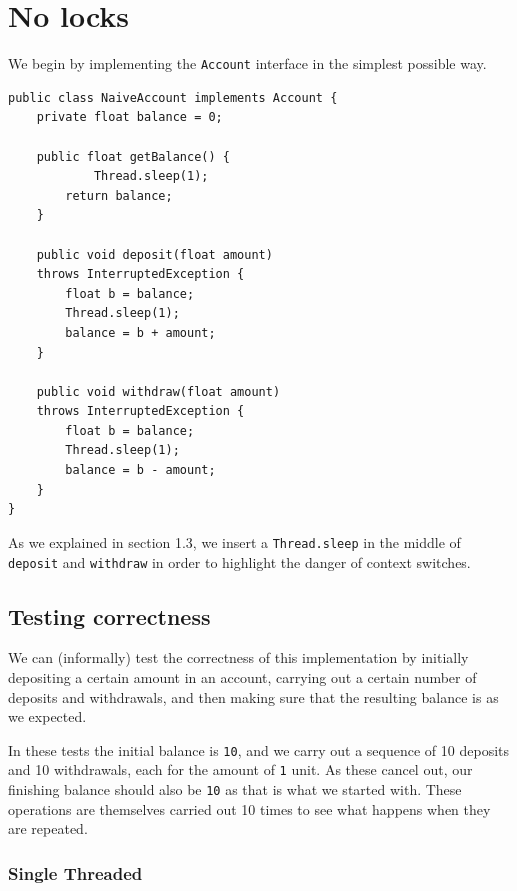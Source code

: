 \documentclass[a4paper,12pt]{kth-mag}
\begin{document}
\newpage

\section{No locks}

We begin by implementing the \texttt{Account} interface in the simplest possible way.

\begin{listing}[H]
	\begin{verbatim}
public class NaiveAccount implements Account {
    private float balance = 0;

    public float getBalance() {
    		Thread.sleep(1);
        return balance;
    }

    public void deposit(float amount) 
    throws InterruptedException {
        float b = balance;
        Thread.sleep(1);
        balance = b + amount;
    }

    public void withdraw(float amount) 
    throws InterruptedException {
        float b = balance;
        Thread.sleep(1);
        balance = b - amount;
    }
}  
	\end{verbatim}
\end{listing}

As we explained in section 1.3, we insert a \texttt{Thread.sleep} in the middle of \texttt{deposit} and \texttt{withdraw} in order to highlight the danger of context switches.

\subsection{Testing correctness}

We can (informally) test the correctness of this implementation by initially depositing a certain amount in an account, carrying out a certain number of deposits and withdrawals, and then making sure that the resulting balance is as we expected.

In these tests the initial balance is \texttt{10}, and we carry out a sequence of 10 deposits and 10 withdrawals, each for the amount of \texttt{1} unit. As these cancel out, our finishing balance should also be \texttt{10} as that is what we started with. These operations are themselves carried out 10 times to see what happens when they are repeated.

\subsubsection{Single Threaded}
\end{document}
